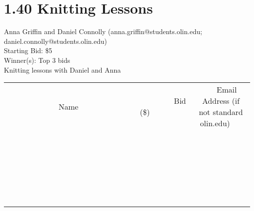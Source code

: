 \documentclass[11pt]{article}
\begin{document}
\section*{1.40 Knitting Lessons}
Anna Griffin and Daniel Connolly (anna.griffin@students.olin.edu; daniel.connolly@students.olin.edu) \\
Starting Bid: \$5 \\
Winner(s): 
Top 3 bids \\
Knitting lessons with Daniel and Anna \\[6ex]
\begin{tabular}{c c c}
~~~~~~~~~~~~~Name~~~~~~~~~~~~~ & ~~~~~~~~~Bid (\$)~~~~~~~~~ & ~~~Email Address (if not standard olin.edu)~~~ \\
 & & \\
\hline
 & & \\
\hline
 & & \\
\hline
 & & \\
\hline
 & & \\
\hline
 & & \\
\hline
 & & \\
\hline
 & & \\
\hline
 & & \\
\hline
 & & \\
\hline
 & & \\
\hline
 & & \\
\hline
 & & \\
\hline
 & & \\
\hline
 & & \\
\hline
 & & \\
\hline
 & & \\
\hline
 & & \\
\hline
 & & \\
\hline
 & & \\
\hline
 & & \\
\hline
 & & \\
\hline
 & & \\
\hline
 & & \\
\hline
 & & \\
\hline
 & & \\
\hline
\end{tabular}
\clearpage
\end{document}
